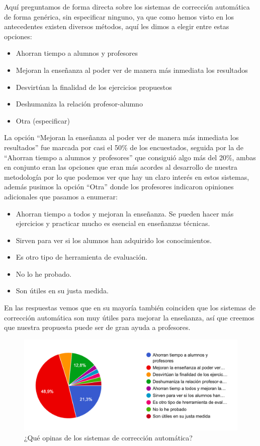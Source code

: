 \begin{enumerate}
Aquí preguntamos de forma directa sobre los sistemas de corrección automática de forma genérica, sin especificar ninguno, ya que como hemos visto en los antecedentes existen diversos métodos, aquí les dimos a elegir entre estas opciones:

\begin{itemize}
    \item Ahorran tiempo a alumnos y profesores
    \item Mejoran la enseñanza al poder ver de manera más inmediata los resultados
    \item Desvirtúan la finalidad de los ejercicios propuestos
    \item Deshumaniza la relación profesor-alumno
    \item Otra (especificar)
\end{itemize}

La opción ``Mejoran la enseñanza al poder ver de manera más inmediata los resultados'' fue marcada por casi el 50\% de los encuestados, seguida por la de ``Ahorran tiempo a alumnos y profesores'' que consiguió algo más del 20\%, ambas en conjunto eran las opciones que eran más acordes al desarrollo de nuestra metodología por lo que podemos ver que hay un claro interés en estos sistemas, además pusimos la opción ``Otra'' donde los profesores indicaron opiniones adicionales que pasamos a enumerar:

\begin{itemize}
    \item Ahorran tiempo a todos y mejoran la enseñanza. Se pueden hacer más ejercicios y practicar mucho es esencial en enseñanzas técnicas.
    \item Sirven para ver si los alumnos han adquirido los conocimientos.
    \item Es otro tipo de herramienta de evaluación.
    \item No lo he probado.
    \item Son útiles en su justa medida.
\end{itemize}

En las respuestas vemos que en su mayoría también coinciden que los sistemas de corrección automática son muy útiles para mejorar la enseñanza, así que creemos que nuestra propuesta puede ser de gran ayuda a profesores.

\begin{figure}[H]
\centering
\includegraphics[width=1.0\textwidth]{../images/quiz_6}
\caption{¿Qué opinas de los sistemas de corrección automática?}
\label{fig:quiz_6}
\end{figure}


\end{enumerate}
